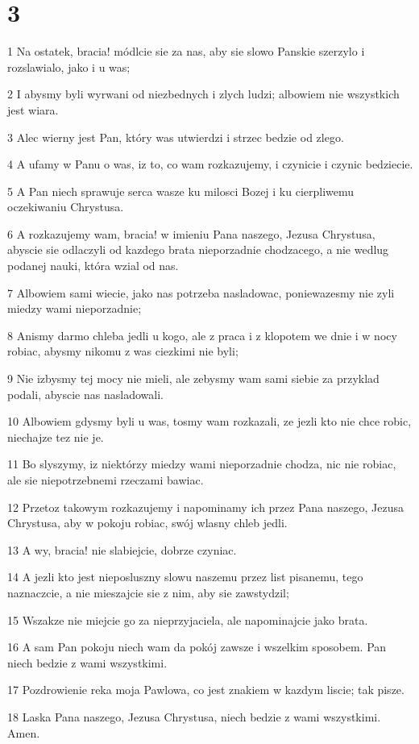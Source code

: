 \chapter{3}

\par 1 Na ostatek, bracia! módlcie sie za nas, aby sie slowo Panskie szerzylo i rozslawialo, jako i u was;
\par 2 I abysmy byli wyrwani od niezbednych i zlych ludzi; albowiem nie wszystkich jest wiara.
\par 3 Alec wierny jest Pan, który was utwierdzi i strzec bedzie od zlego.
\par 4 A ufamy w Panu o was, iz to, co wam rozkazujemy, i czynicie i czynic bedziecie.
\par 5 A Pan niech sprawuje serca wasze ku milosci Bozej i ku cierpliwemu oczekiwaniu Chrystusa.
\par 6 A rozkazujemy wam, bracia! w imieniu Pana naszego, Jezusa Chrystusa, abyscie sie odlaczyli od kazdego brata nieporzadnie chodzacego, a nie wedlug podanej nauki, która wzial od nas.
\par 7 Albowiem sami wiecie, jako nas potrzeba nasladowac, poniewazesmy nie zyli miedzy wami nieporzadnie;
\par 8 Anismy darmo chleba jedli u kogo, ale z praca i z klopotem we dnie i w nocy robiac, abysmy nikomu z was ciezkimi nie byli;
\par 9 Nie izbysmy tej mocy nie mieli, ale zebysmy wam sami siebie za przyklad podali, abyscie nas nasladowali.
\par 10 Albowiem gdysmy byli u was, tosmy wam rozkazali, ze jezli kto nie chce robic, niechajze tez nie je.
\par 11 Bo slyszymy, iz niektórzy miedzy wami nieporzadnie chodza, nic nie robiac, ale sie niepotrzebnemi rzeczami bawiac.
\par 12 Przetoz takowym rozkazujemy i napominamy ich przez Pana naszego, Jezusa Chrystusa, aby w pokoju robiac, swój wlasny chleb jedli.
\par 13 A wy, bracia! nie slabiejcie, dobrze czyniac.
\par 14 A jezli kto jest nieposluszny slowu naszemu przez list pisanemu, tego naznaczcie, a nie mieszajcie sie z nim, aby sie zawstydzil;
\par 15 Wszakze nie miejcie go za nieprzyjaciela, ale napominajcie jako brata.
\par 16 A sam Pan pokoju niech wam da pokój zawsze i wszelkim sposobem. Pan niech bedzie z wami wszystkimi.
\par 17 Pozdrowienie reka moja Pawlowa, co jest znakiem w kazdym liscie; tak pisze.
\par 18 Laska Pana naszego, Jezusa Chrystusa, niech bedzie z wami wszystkimi. Amen.


